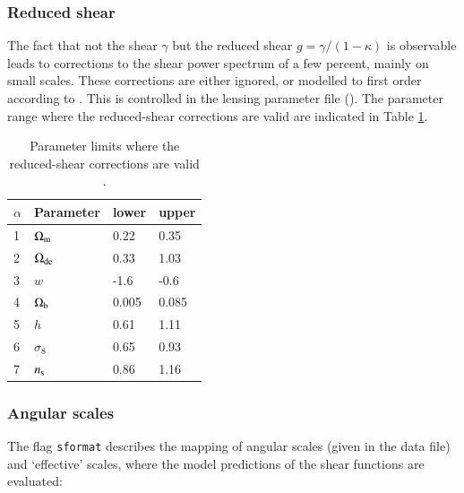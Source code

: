 \documentclass[11pt, chapterprefix, headsepline]{scrartcl}
\begin{document}
\subsubsection{Reduced shear}

The fact that not the shear $\gamma$ but the reduced shear $g =
\gamma/(1-\kappa)$ is observable leads to corrections to the shear
power spectrum of a few percent, mainly on small scales. These
corrections are either ignored, or modelled to first order according
to \citet{K10}. This is controlled in the lensing parameter file
(). The parameter range where the reduced-shear
corrections are valid are indicated in Table \ref{tab:limits}.

\begin{table}

  \caption{Parameter limits where the reduced-shear corrections are
    valid \citep[from][]{K10}.}
  \label{tab:limits}

  \begin{center}
    \begin{tabular}{|l|l|l|l|}\hline
      \rule[-3mm]{0em}{8mm}$\alpha$	 &Parameter	 &lower	 &upper	\\\hline\hline
      1	 &$\Omega_{\rm{m}}$	 &0.22	 &0.35	\\\hline
      2	 &$\Omega_{\rm{de}}$	 &0.33	 &1.03	\\\hline
      3	 &$w$	 &-1.6	 &-0.6	\\\hline
      4	 &$\Omega_{\rm{b}}$	 &0.005	 &0.085	\\\hline
      5	 &$h$	 &0.61	 &1.11	\\\hline
      6	 &$\sigma_8$	 &0.65	 &0.93	\\\hline
      7	 &$n_{\rm{s}}$	 &0.86	 &1.16	\\\hline
    \end{tabular}
  \end{center}

\end{table}


\subsubsection{Angular scales}


The flag \texttt{sformat} describes the mapping of angular scales (given in the
data file) and `effective' scales, where the model predictions of the
shear functions are evaluated:
\end{document}
